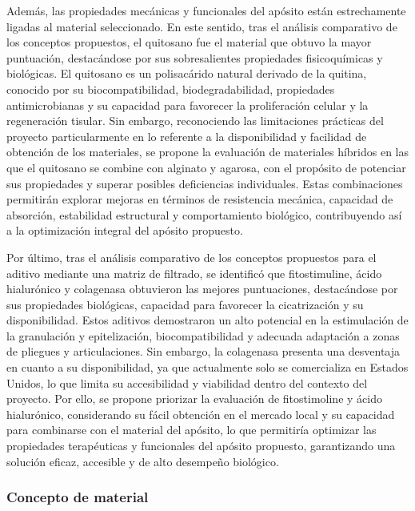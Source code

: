 \documentclass[../../DocumentoCompleto.tex]{subfiles}
\begin{document}
  Además, las propiedades mecánicas y funcionales del apósito están estrechamente ligadas al material seleccionado. En este sentido, tras el análisis comparativo de los conceptos propuestos, el quitosano fue el material que obtuvo la mayor puntuación, destacándose por sus sobresalientes propiedades fisicoquímicas y biológicas. El quitosano es un polisacárido natural derivado de la quitina, conocido por su biocompatibilidad, biodegradabilidad, propiedades antimicrobianas y su capacidad para favorecer la proliferación celular y la regeneración tisular. Sin embargo, reconociendo las limitaciones prácticas del proyecto particularmente en lo referente a la disponibilidad y facilidad de obtención de los materiales, se propone la evaluación de materiales híbridos en las que el quitosano se combine con alginato y agarosa, con el propósito de potenciar sus propiedades y superar posibles deficiencias individuales. Estas combinaciones permitirán explorar mejoras en términos de resistencia mecánica, capacidad de absorción, estabilidad estructural y comportamiento biológico, contribuyendo así a la optimización integral del apósito propuesto.
  
  Por último, tras el análisis comparativo de los conceptos propuestos para el aditivo mediante una matriz de filtrado, se identificó que fitostimuline, ácido hialurónico y colagenasa obtuvieron las mejores puntuaciones, destacándose por sus propiedades biológicas, capacidad para favorecer la cicatrización y su disponibilidad. Estos aditivos demostraron un alto potencial en la estimulación de la granulación y epitelización, biocompatibilidad y adecuada adaptación a zonas de pliegues y articulaciones. Sin embargo, la colagenasa presenta una desventaja en cuanto a su disponibilidad, ya que actualmente solo se comercializa en Estados Unidos, lo que limita su accesibilidad y viabilidad dentro del contexto del proyecto. Por ello, se propone priorizar la evaluación de fitostimoline y ácido hialurónico, considerando su fácil obtención en el mercado local y su capacidad para combinarse con el material del apósito, lo que permitiría optimizar las propiedades terapéuticas y funcionales del apósito propuesto, garantizando una solución eficaz, accesible y de alto desempeño biológico.
 
 
 
    \subsubsection*{Concepto de material}
\end{document}
